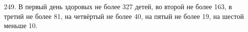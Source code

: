 249. В первый день здоровых не более 327 детей, во второй не более 163, в третий не более 81, на четвёртый не более 40, на пятый не более 19, на шестой меньше 10.\\
